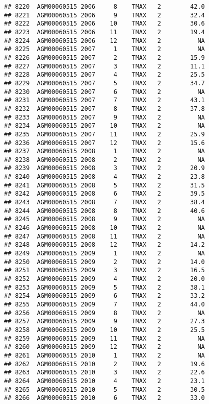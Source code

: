 \documentclass{article}\usepackage[]{graphicx}\usepackage[]{color}
\makeatletter
\newenvironment{kframe}{%
 \def\at@end@of@kframe{}%
 \ifinner\ifhmode%
  \def\at@end@of@kframe{\end{minipage}}%
  \begin{minipage}{\columnwidth}%
 \fi\fi%
 \def\FrameCommand##1{\hskip\@totalleftmargin \hskip-\fboxsep
 \colorbox{shadecolor}{##1}\hskip-\fboxsep
     \hskip-\linewidth \hskip-\@totalleftmargin \hskip\columnwidth}%
 \MakeFramed {\advance\hsize-\width
   \@totalleftmargin\z@ \linewidth\hsize
   \@setminipage}}%
 {\par\unskip\endMakeFramed%
 \at@end@of@kframe}
\newenvironment{knitrout}{}{} %
\makeatother
\begin{document}
\begin{knitrout}
\begin{kframe}
\begin{verbatim}
## 8220  AGM00060515 2006     8    TMAX   2        42.0
## 8221  AGM00060515 2006     9    TMAX   2        32.4
## 8222  AGM00060515 2006    10    TMAX   2        30.6
## 8223  AGM00060515 2006    11    TMAX   2        19.4
## 8224  AGM00060515 2006    12    TMAX   2          NA
## 8225  AGM00060515 2007     1    TMAX   2          NA
## 8226  AGM00060515 2007     2    TMAX   2        15.9
## 8227  AGM00060515 2007     3    TMAX   2        11.1
## 8228  AGM00060515 2007     4    TMAX   2        25.5
## 8229  AGM00060515 2007     5    TMAX   2        34.7
## 8230  AGM00060515 2007     6    TMAX   2          NA
## 8231  AGM00060515 2007     7    TMAX   2        43.1
## 8232  AGM00060515 2007     8    TMAX   2        37.8
## 8233  AGM00060515 2007     9    TMAX   2          NA
## 8234  AGM00060515 2007    10    TMAX   2          NA
## 8235  AGM00060515 2007    11    TMAX   2        25.9
## 8236  AGM00060515 2007    12    TMAX   2        15.6
## 8237  AGM00060515 2008     1    TMAX   2          NA
## 8238  AGM00060515 2008     2    TMAX   2          NA
## 8239  AGM00060515 2008     3    TMAX   2        20.9
## 8240  AGM00060515 2008     4    TMAX   2        23.8
## 8241  AGM00060515 2008     5    TMAX   2        31.5
## 8242  AGM00060515 2008     6    TMAX   2        39.5
## 8243  AGM00060515 2008     7    TMAX   2        38.4
## 8244  AGM00060515 2008     8    TMAX   2        40.6
## 8245  AGM00060515 2008     9    TMAX   2          NA
## 8246  AGM00060515 2008    10    TMAX   2          NA
## 8247  AGM00060515 2008    11    TMAX   2          NA
## 8248  AGM00060515 2008    12    TMAX   2        14.2
## 8249  AGM00060515 2009     1    TMAX   2          NA
## 8250  AGM00060515 2009     2    TMAX   2        14.0
## 8251  AGM00060515 2009     3    TMAX   2        16.5
## 8252  AGM00060515 2009     4    TMAX   2        20.0
## 8253  AGM00060515 2009     5    TMAX   2        38.1
## 8254  AGM00060515 2009     6    TMAX   2        33.2
## 8255  AGM00060515 2009     7    TMAX   2        44.0
## 8256  AGM00060515 2009     8    TMAX   2          NA
## 8257  AGM00060515 2009     9    TMAX   2        27.3
## 8258  AGM00060515 2009    10    TMAX   2        25.5
## 8259  AGM00060515 2009    11    TMAX   2          NA
## 8260  AGM00060515 2009    12    TMAX   2          NA
## 8261  AGM00060515 2010     1    TMAX   2          NA
## 8262  AGM00060515 2010     2    TMAX   2        19.6
## 8263  AGM00060515 2010     3    TMAX   2        22.6
## 8264  AGM00060515 2010     4    TMAX   2        23.1
## 8265  AGM00060515 2010     5    TMAX   2        30.5
## 8266  AGM00060515 2010     6    TMAX   2        33.0

\end{verbatim}
\end{kframe}
\end{knitrout}
\end{document}
